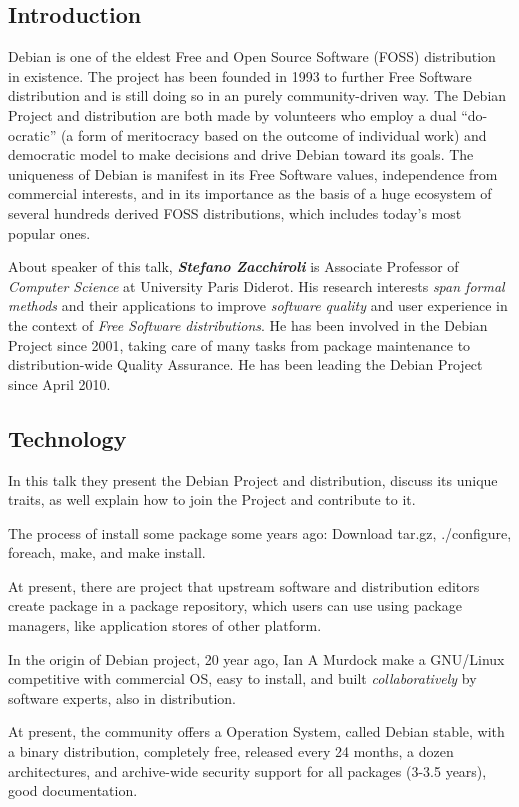 \documentclass[11pt]{article}
\begin{document}
\subsection{Introduction}
Debian is one of the eldest Free and Open Source Software (FOSS) distribution in existence. The project has been founded in 1993 to further Free Software distribution and is still doing so in an purely community-driven way. The Debian Project and distribution are both made by volunteers who employ a dual ``do-ocratic'' (a form of meritocracy based on the outcome of individual work) and democratic model to make decisions and drive Debian toward its goals. The uniqueness of Debian is manifest in its Free Software values, independence from commercial interests, and in its importance as the basis of a huge ecosystem of several hundreds derived FOSS distributions, which includes today's most popular ones. 

About speaker of this talk, \emph{\textbf{Stefano Zacchiroli}} is Associate Professor of \emph{Computer Science} at University Paris Diderot. His research interests \emph{span formal methods} and their applications to improve \emph{software quality} and user experience in the context of \emph{Free Software distributions}. He has been involved in the Debian Project since 2001, taking care of many tasks from package maintenance to distribution-wide Quality Assurance. He has been leading the Debian Project since April 2010.

\subsection{Technology}
In this talk they present the Debian Project and distribution, discuss its unique traits, as well explain how to join the Project and contribute to it.

The process of install some package some years ago: Download tar.gz, ./configure, foreach, make, and make install.

At present, there are project that upstream software and distribution editors create package in a package repository, which users can use using package managers, like application stores of other platform.

In the origin of Debian project, 20 year ago, Ian A Murdock make a GNU/Linux competitive with commercial OS, easy to install, and built \emph{collaboratively} by software experts, also in distribution.

At present, the community offers a Operation System, called Debian stable, with a binary distribution, completely free, released every 24 months, a dozen architectures, and archive-wide security support for all packages (3-3.5 years), good documentation.
\end{document}
